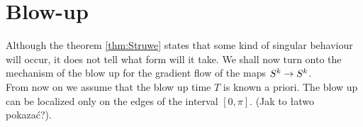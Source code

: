 \section{Blow-up}
\label{sec:blow-up}

Although the theorem \ref{thm:Struwe} states that some kind of
singular behaviour will occur, it does not tell what form will it
take. We shall now turn onto the mechanism of the blow up for the
gradient flow of the maps $S^k\rightarrow S^k$.\\

From now on we assume that the blow up time $T$ is known a priori. The
blow up can be localized only on the edges of the interval
$[0,\pi]$. (Jak to łatwo pokazać?).\\




